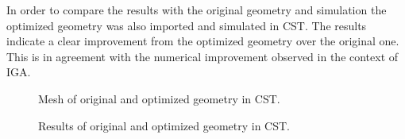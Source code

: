 In order to compare the results with the original geometry and simulation the optimized geometry was also imported and simulated in CST. The results indicate a clear improvement from the optimized geometry over the original one. This is in agreement with the numerical improvement observed in the context of IGA.

\begin{center}
\begin{figure}[H]
   \begin{subfigure}{0.45\textwidth}
   \end{subfigure}
   \begin{subfigure}{0.45\textwidth}
   \end{subfigure}
   \caption{Mesh of original and optimized geometry in CST.}
\end{figure}
\end{center}

\begin{center}
\begin{figure}[H]
   \begin{subfigure}{0.45\textwidth}
   \end{subfigure}
   \begin{subfigure}{0.45\textwidth}
   \end{subfigure}
   \caption{Results of original and optimized geometry in CST.}
\end{figure}
\end{center}

